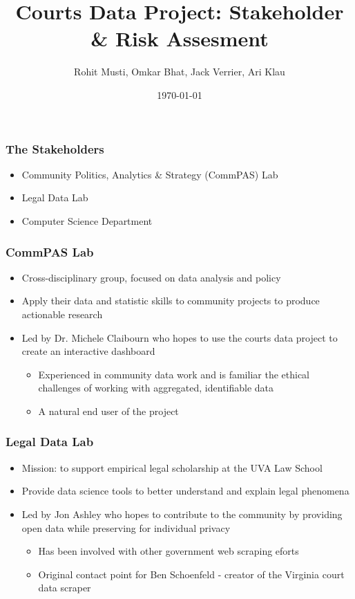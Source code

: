 \documentclass{beamer}
\title{Courts Data Project: Stakeholder \& Risk Assesment}
\author{Rohit Musti, Omkar Bhat, Jack Verrier, Ari Klau}
\institute{Innovating in the Public Interest}
\date{\today}
\begin{document}
 
\frame{\titlepage}

\begin{frame}
\frametitle{The Stakeholders}
\begin{itemize}
    \item Community Politics, Analytics \& Strategy (CommPAS) Lab
    \item Legal Data Lab
    \item Computer Science Department
\end{itemize}
\end{frame}

\begin{frame}
\frametitle{CommPAS Lab}
\begin{itemize}
    \item Cross-disciplinary group, focused on data analysis and policy
    \item Apply their data and statistic skills to community projects to produce actionable research
    \item Led by Dr. Michele Claibourn who hopes to use the courts data project to create an interactive dashboard
    \begin{itemize}
        \item Experienced in community data work and is familiar the ethical challenges of working with aggregated, identifiable data
        \item A natural end user of the project
    \end{itemize}
\end{itemize}
\end{frame}

\begin{frame}
\frametitle{Legal Data Lab}
\begin{itemize}
    \item Mission: to support  empirical legal scholarship at the UVA Law School
    \item Provide data science tools to better understand and explain legal phenomena
    \item Led by Jon Ashley who hopes to contribute to the community by providing open data while preserving for individual privacy
    \begin{itemize}
        \item Has been involved with other government web scraping eforts
        \item Original contact point for Ben Schoenfeld - creator of the Virginia court data scraper
    \end{itemize}
\end{itemize}
\end{frame}
\end{document}
